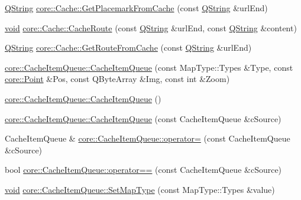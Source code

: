 \begin{DoxyCompactItemize}
\item 
\hyperlink{group___u_a_v_objects_plugin_gab9d252f49c333c94a72f97ce3105a32d}{\-Q\-String} \hyperlink{group___o_p_map_widget_ga6b5384bc829769fac7099d2f62188361}{core\-::\-Cache\-::\-Get\-Placemark\-From\-Cache} (const \hyperlink{group___u_a_v_objects_plugin_gab9d252f49c333c94a72f97ce3105a32d}{\-Q\-String} \&url\-End)
\item 
\hyperlink{group___u_a_v_objects_plugin_ga444cf2ff3f0ecbe028adce838d373f5c}{void} \hyperlink{group___o_p_map_widget_ga39845c04f9d203c0a71e50b1576e71c6}{core\-::\-Cache\-::\-Cache\-Route} (const \hyperlink{group___u_a_v_objects_plugin_gab9d252f49c333c94a72f97ce3105a32d}{\-Q\-String} \&url\-End, const \hyperlink{group___u_a_v_objects_plugin_gab9d252f49c333c94a72f97ce3105a32d}{\-Q\-String} \&content)
\item 
\hyperlink{group___u_a_v_objects_plugin_gab9d252f49c333c94a72f97ce3105a32d}{\-Q\-String} \hyperlink{group___o_p_map_widget_gaa57f8065b3641c25a3305de4ab621abe}{core\-::\-Cache\-::\-Get\-Route\-From\-Cache} (const \hyperlink{group___u_a_v_objects_plugin_gab9d252f49c333c94a72f97ce3105a32d}{\-Q\-String} \&url\-End)
\item 
\hyperlink{group___o_p_map_widget_gadc9b31f39de2abe3de6041258d92a7bd}{core\-::\-Cache\-Item\-Queue\-::\-Cache\-Item\-Queue} (const \-Map\-Type\-::\-Types \&\-Type, const \hyperlink{structcore_1_1_point}{core\-::\-Point} \&\-Pos, const \-Q\-Byte\-Array \&\-Img, const int \&\-Zoom)
\item 
\hyperlink{group___o_p_map_widget_ga51cf399db0ddbbef8d48f8f8e420f373}{core\-::\-Cache\-Item\-Queue\-::\-Cache\-Item\-Queue} ()
\item 
\hyperlink{group___o_p_map_widget_ga3dce0468e367c4fc113ecf651b691a9f}{core\-::\-Cache\-Item\-Queue\-::\-Cache\-Item\-Queue} (const \-Cache\-Item\-Queue \&c\-Source)
\item 
\-Cache\-Item\-Queue \& \hyperlink{group___o_p_map_widget_gae7e315a2dbbb005c92e8d39d4e189d75}{core\-::\-Cache\-Item\-Queue\-::operator=} (const \-Cache\-Item\-Queue \&c\-Source)
\item 
bool \hyperlink{group___o_p_map_widget_ga18cc75c132d29a3dde534259ffe74e0e}{core\-::\-Cache\-Item\-Queue\-::operator==} (const \-Cache\-Item\-Queue \&c\-Source)
\item 
\hyperlink{group___u_a_v_objects_plugin_ga444cf2ff3f0ecbe028adce838d373f5c}{void} \hyperlink{group___o_p_map_widget_ga182224d6a020047e69c16ce20adb25bd}{core\-::\-Cache\-Item\-Queue\-::\-Set\-Map\-Type} (const \-Map\-Type\-::\-Types \&value)

\end{DoxyCompactItemize}
